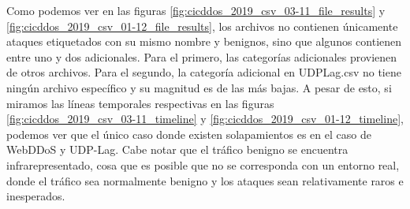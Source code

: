 Como podemos ver en las figuras \ref{fig:cicddos_2019_csv_03-11_file_results} y \ref{fig:cicddos_2019_csv_01-12_file_results}, los archivos no contienen únicamente ataques etiquetados con su mismo nombre y benignos, sino que algunos contienen entre uno y dos adicionales. Para el primero, las categorías adicionales provienen de otros archivos. Para el segundo, la categoría adicional en UDPLag.csv no tiene ningún archivo específico y su magnitud es de las más bajas. A pesar de esto, si miramos las líneas temporales respectivas en las figuras \ref{fig:cicddos_2019_csv_03-11_timeline} y \ref{fig:cicddos_2019_csv_01-12_timeline}, podemos ver que el único caso donde existen solapamientos es en el caso de WebDDoS y UDP-Lag. Cabe notar que el tráfico benigno se encuentra infrarepresentado, cosa que es posible que no se corresponda con un entorno real, donde el tráfico sea normalmente benigno y los ataques sean relativamente raros e inesperados.

